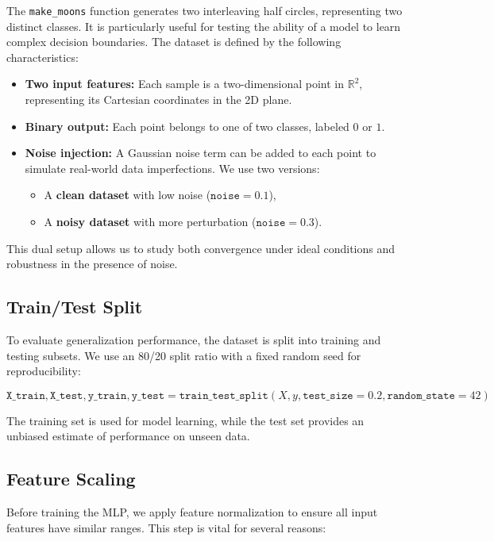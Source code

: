 \documentclass[12pt]{article}
\begin{document}
The \texttt{make\_moons} function generates two interleaving half circles, representing two distinct classes. It is particularly useful for testing the ability of a model to learn complex decision boundaries. The dataset is defined by the following characteristics:

\begin{itemize}
    \item \textbf{Two input features:} Each sample is a two-dimensional point in $\mathbb{R}^2$, representing its Cartesian coordinates in the 2D plane.
    \item \textbf{Binary output:} Each point belongs to one of two classes, labeled $0$ or $1$.
    \item \textbf{Noise injection:} A Gaussian noise term can be added to each point to simulate real-world data imperfections. We use two versions:
    \begin{itemize}
        \item A \textbf{clean dataset} with low noise ($\texttt{noise}=0.1$),
        \item A \textbf{noisy dataset} with more perturbation ($\texttt{noise}=0.3$).
    \end{itemize}
\end{itemize}

This dual setup allows us to study both convergence under ideal conditions and robustness in the presence of noise.

\subsection{Train/Test Split}

To evaluate generalization performance, the dataset is split into training and testing subsets. We use an 80/20 split ratio with a fixed random seed for reproducibility:

\[
\texttt{X\_train}, \texttt{X\_test}, \texttt{y\_train}, \texttt{y\_test} = \texttt{train\_test\_split}(X, y, \texttt{test\_size}=0.2, \texttt{random\_state}=42)
\]

The training set is used for model learning, while the test set provides an unbiased estimate of performance on unseen data.

\subsection{Feature Scaling}

Before training the MLP, we apply feature normalization to ensure all input features have similar ranges. This step is vital for several reasons:
\end{document}
